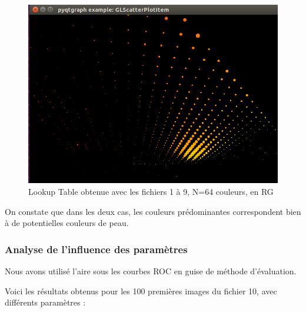 \documentclass[a4paper,11pt]{article}
\begin{document}
\begin{figure}[H]
\begin{center}
    \includegraphics[scale=0.5]{lT_1_9_4_RG.png}
    \caption{Lookup Table obtenue avec les fichiers 1 à 9, N=64 couleurs, en RG}
\end{center}
\end{figure}

On constate que dans les deux cas, les couleurs prédominantes correspondent bien à de potentielles couleurs de peau.

\subsubsection{Analyse de l'influence des paramètres}

Nous avons utilisé l'aire sous les courbes ROC en guise de méthode d'évaluation.

Voici les résultats obtenus pour les 100 premières images du fichier 10, avec différents paramètres :
\end{document}
